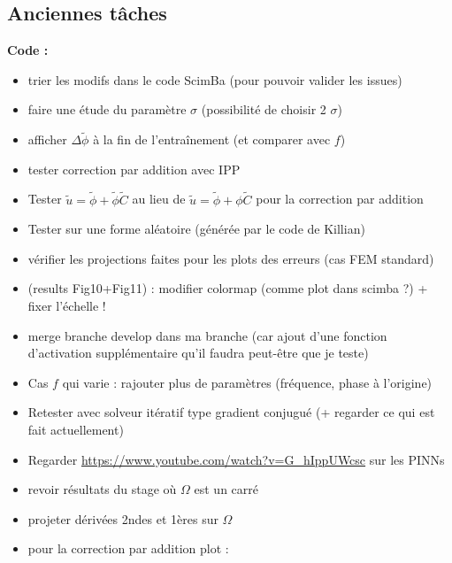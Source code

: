 \subsection*{Anciennes tâches}

\textbf{Code :}
\begin{itemize}[label=$\square$] 
	\item[\previous{5}] trier les modifs dans le code ScimBa (pour pouvoir valider les issues)
	\item[\done] faire une étude du paramètre $\sigma$ (possibilité de choisir 2 $\sigma$) \textcolor{Green}{}
	\item[\previous{5}] afficher $\Delta \tilde{\phi}$ à la fin de l'entraînement (et comparer avec $f$)
	\item[\previous{5}] tester correction par addition avec IPP
	\item[\wontfix] Tester $\tilde{u}=\tilde{\phi}+\tilde{\phi}\tilde{C}$ au lieu de $\tilde{u}=\tilde{\phi}+\phi\tilde{C}$ pour la correction par addition \textcolor{Green}{}
	\item[\done] Tester sur une forme aléatoire (générée par le code de Killian) \textcolor{Green}{}
	\item[\previous{6}] vérifier les projections faites pour les plots des erreurs (cas FEM standard)
	\item[\previous{6}] (results Fig10+Fig11) : modifier colormap (comme plot dans scimba ?) + fixer l'échelle !
	\item[\previous{6}] merge branche develop dans ma branche (car ajout d'une fonction d'activation supplémentaire qu'il faudra peut-être que je teste)
	\item[\previous{6}] Cas $f$ qui varie : rajouter plus de paramètres (fréquence, phase à l'origine) 
	\item[\previous{6}] Retester avec solveur itératif type gradient conjugué (+ regarder ce qui est fait actuellement)
	\item[\previous{6}] Regarder \url{https://www.youtube.com/watch?v=G_hIppUWcsc} sur les PINNs
	\item[\previous{7}] revoir résultats du stage où $\Omega$ est un carré
	\item[\done] projeter dérivées 2ndes et 1ères sur $\Omega$ \textcolor{Green}{}
	\item[\previous{7}] pour la correction par addition plot : \\
	\begin{minipage}{0.48\linewidth}

\end{minipage}
\end{itemize}
